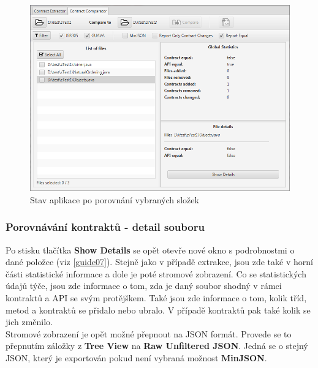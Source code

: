 			\begin{figure}[!htb]
					\centering
					\includegraphics[width=1\textwidth]{img/guide08.png}
					\caption[guide08]{Stav aplikace po porovnání vybraných složek}
					\label{guide08}
				\endminipage\hfill
			\end{figure}			
			
	\subsubsection{Porovnávání kontraktů - detail souboru}
		Po stisku tlačítka \textbf{Show Details} se opět otevře nové okno s podrobnostmi o dané položce (viz \ref{guide07}). Stejně jako v případě extrakce, jsou zde také v horní části statistické informace a dole je poté stromové zobrazení. Co se statistických údajů týče, jsou zde informace o tom, zda je daný soubor shodný v rámci kontraktů a API se svým protějškem. Také jsou zde informace o tom, kolik tříd, metod a kontraktů se přidalo nebo ubralo. V případě kontraktů pak také kolik se jich změnilo.\\
		
		Stromové zobrazení je opět možné přepnout na JSON formát. Provede se to přepnutím záložky z \textbf{Tree View} na \textbf{Raw Unfiltered JSON}. Jedná se o stejný JSON, který je exportován pokud není vybraná možnost \textbf{MinJSON}.
		
